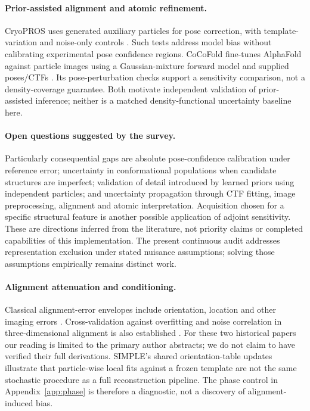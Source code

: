 \paragraph{Prior-assisted alignment and atomic refinement.} CryoPROS uses generated auxiliary particles for pose correction, with template-variation and noise-only controls \citep{cryopros2025}. Such tests address model bias without calibrating experimental pose confidence regions. CoCoFold fine-tunes AlphaFold against particle images using a Gaussian-mixture forward model and supplied poses/CTFs \citep{cocofold2026}. Its pose-perturbation checks support a sensitivity comparison, not a density-coverage guarantee. Both motivate independent validation of prior-assisted inference; neither is a matched density-functional uncertainty baseline here.

\paragraph{Open questions suggested by the survey.} Particularly consequential gaps are absolute pose-confidence calibration under reference error; uncertainty in conformational populations when candidate structures are imperfect; validation of detail introduced by learned priors using independent particles; and uncertainty propagation through CTF fitting, image preprocessing, alignment and atomic interpretation. Acquisition chosen for a specific structural feature is another possible application of adjoint sensitivity. These are directions inferred from the literature, not priority claims or completed capabilities of this implementation. The present continuous audit addresses representation exclusion under stated nuisance assumptions; solving those assumptions empirically remains distinct work.


\paragraph{Alignment attenuation and conditioning.} Classical alignment-error envelopes include orientation, location and other imaging errors \citep{jensen2001}. Cross-validation against overfitting and noise correlation in three-dimensional alignment is also established \citep{shaikh2003}. For these two historical papers our reading is limited to the primary author abstracts; we do not claim to have verified their full derivations. SIMPLE's shared orientation-table updates \citep{simple2025} illustrate that particle-wise local fits against a frozen template are not the same stochastic procedure as a full reconstruction pipeline. The phase control in Appendix~\ref{app:phase} is therefore a diagnostic, not a discovery of alignment-induced bias.

